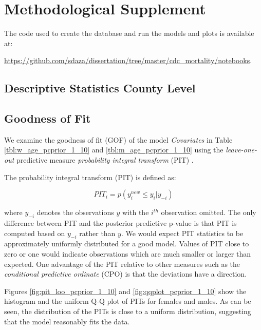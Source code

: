 \documentclass[11pt]{article}
\begin{document}
\section{Methodological Supplement}\label{sec:appendix}

The code used to create the database and run the models and plots is available at: 

\url{https://github.com/sdaza/dissertation/tree/master/cdc_mortality/notebooks}. 

\subsection{Descriptive Statistics County Level}



\newpage


\newpage
\subsection{Goodness of Fit}\label{sec:gof}

We examine the goodness of fit (GOF) of the model \textit{Covariates} in Table \ref{tbl:w_age_pcprior_1_10} and  \ref{tbl:m_age_pcprior_1_10} using the \textit{leave-one-out} predictive measure \textit{probability integral transform} (PIT) \citep{Wang2018}.

The probability integral transform (PIT) is defined as: 

$$PIT_i=p(y^{new}_i\leq y_i|y_{-i})$$

\noindent where $y_{-i}$ denotes the observations $y$ with the $i^{th}$ observation omitted. The only difference between PIT and the posterior predictive p-value is that PIT is computed based on $y_{-i}$ rather than $y$. We would expect PIT statistics to be approximately uniformly distributed for a good model. Values of PIT close to zero or one would indicate observations which are much smaller or larger than expected. One advantage of the PIT relative to other measures such as the \textit{conditional predictive ordinate} (CPO) is that the deviations have a direction.

Figures \ref{fig:pit_loo_pcprior_1_10} and \ref{fig:qqplot_pcprior_1_10} show the histogram and the uniform Q-Q plot of PITs for females and males. As can be seen, the distribution of the PITs is close to a uniform distribution, suggesting that the model reasonably fits the data. 


% 


\end{document}

